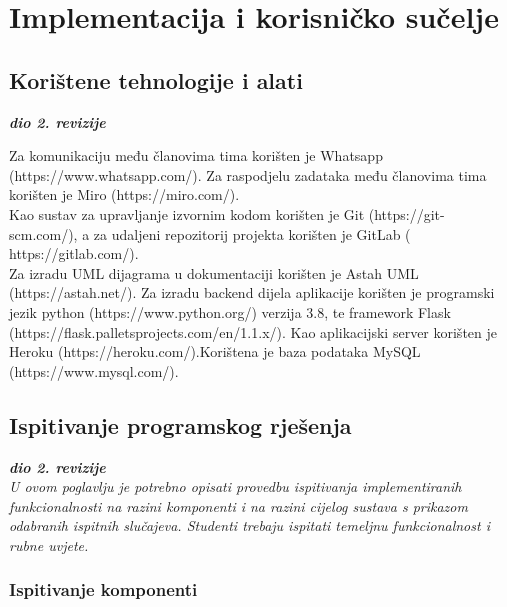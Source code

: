\chapter{Implementacija i korisničko sučelje}
		
		
		\section{Korištene tehnologije i alati}
		
			\textbf{\textit{dio 2. revizije}}
			
			 Za komunikaciju među članovima tima korišten je Whatsapp (https://www.whatsapp.com/). Za raspodjelu zadataka među članovima tima korišten je Miro (https://miro.com/).\\
			 Kao sustav za upravljanje izvornim kodom korišten je Git (https://git-scm.com/), a za udaljeni repozitorij projekta korišten je GitLab ( https://gitlab.com/).\\
			 Za izradu UML dijagrama u dokumentaciji korišten je Astah UML (https://astah.net/).
			 Za izradu backend dijela aplikacije korišten je programski jezik python (https://www.python.org/) verzija 3.8, te framework Flask (https://flask.palletsprojects.com/en/1.1.x/). Kao aplikacijski server korišten je Heroku (https://heroku.com/).Korištena je baza podataka MySQL (https://www.mysql.com/).
			\eject 
		
	
		\section{Ispitivanje programskog rješenja}
			
			\textbf{\textit{dio 2. revizije}}\\
			
			 \textit{U ovom poglavlju je potrebno opisati provedbu ispitivanja implementiranih funkcionalnosti na razini komponenti i na razini cijelog sustava s prikazom odabranih ispitnih slučajeva. Studenti trebaju ispitati temeljnu funkcionalnost i rubne uvjete.}
	
			
			\subsection{Ispitivanje komponenti}
			
